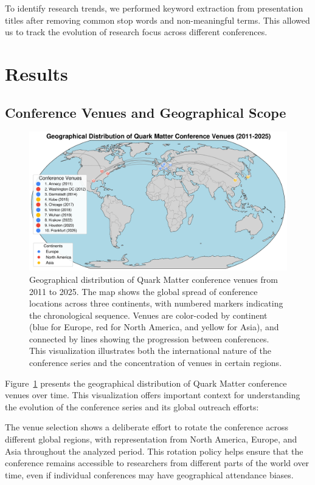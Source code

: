 \documentclass[a4paper,11pt]{article}
\begin{document}
To identify research trends, we performed keyword extraction from presentation titles after removing common stop words and non-meaningful terms. This allowed us to track the evolution of research focus across different conferences.

\section{Results}

\subsection{Conference Venues and Geographical Scope}

\begin{figure}[H]
\centering
\includegraphics[width=\textwidth]{figures/conference_venues.pdf}
\caption{Geographical distribution of Quark Matter conference venues from 2011 to 2025. The map shows the global spread of conference locations across three continents, with numbered markers indicating the chronological sequence. Venues are color-coded by continent (blue for Europe, red for North America, and yellow for Asia), and connected by lines showing the progression between conferences. This visualization illustrates both the international nature of the conference series and the concentration of venues in certain regions.}
\label{fig:venues}
\end{figure}

Figure~\ref{fig:venues} presents the geographical distribution of Quark Matter conference venues over time. This visualization offers important context for understanding the evolution of the conference series and its global outreach efforts:

The venue selection shows a deliberate effort to rotate the conference across different global regions, with representation from North America, Europe, and Asia throughout the analyzed period. This rotation policy helps ensure that the conference remains accessible to researchers from different parts of the world over time, even if individual conferences may have geographical attendance biases.
\end{document}
